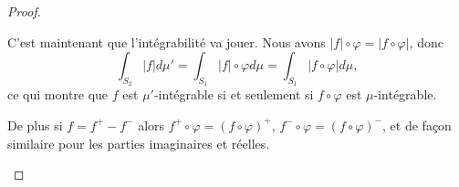 \begin{proof}
\begin{subproof}
		C'est maintenant que l'intégrabilité va jouer. Nous avons \( | f |\circ\varphi=| f\circ\varphi |\), donc
		\begin{equation}
			\int_{S_2}| f |d\mu'=\int_{S_1}| f |\circ\varphi d\mu=\int_{S_1}| f\circ \varphi |d\mu,
		\end{equation}
		ce qui montre que \( f\) est \( \mu'\)-intégrable si et seulement si \( f\circ\varphi\) est \( \mu\)-intégrable.

		De plus si \(f=f^+-f^- \) alors \( f^+\circ\varphi=(f\circ\varphi)^+\), \( f^-\circ\varphi=(f\circ\varphi)^-\), et de façon similaire pour les parties imaginaires et réelles.
	\end{subproof}
\end{proof}
